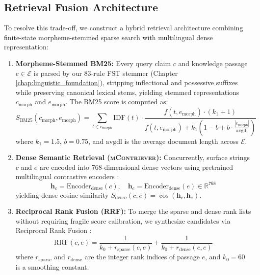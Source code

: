 \subsection{Retrieval Fusion Architecture}
To resolve this trade-off, we construct a hybrid retrieval architecture combining finite-state morpheme-stemmed sparse search with multilingual dense representation:
\begin{enumerate}
    \item \textbf{Morpheme-Stemmed BM25:} Every query claim $c$ and knowledge passage $e \in \mathcal{E}$ is parsed by our 83-rule FST stemmer (Chapter \ref{chap:linguistic_foundation}), stripping inflectional and possessive suffixes while preserving canonical lexical stems, yielding stemmed representations $c_{\text{morph}}$ and $e_{\text{morph}}$. The BM25 score is computed as:
    \begin{equation}
        \label{eq:bm25_stemmed}
        S_{\text{BM25}}(c_{\text{morph}}, e_{\text{morph}}) = \sum_{t \in c_{\text{morph}}} \mathrm{IDF}(t) \cdot \frac{f(t, e_{\text{morph}}) \cdot (k_1 + 1)}{f(t, e_{\text{morph}}) + k_1 \left(1 - b + b \cdot \frac{|e_{\text{morph}}|}{\mathrm{avgdl}}\right)}
    \end{equation}
    where $k_1 = 1.5$, $b = 0.75$, and $\mathrm{avgdl}$ is the average document length across $\mathcal{E}$.
    
    \item \textbf{Dense Semantic Retrieval (\textsc{mContriever}):} Concurrently, surface strings $c$ and $e$ are encoded into 768-dimensional dense vectors using pretrained multilingual contrastive encoders \citep{izacard2021contriever}:
    \begin{equation}
        \mathbf{h}_c = \mathrm{Encoder}_{\text{dense}}(c), \quad \mathbf{h}_e = \mathrm{Encoder}_{\text{dense}}(e) \in \mathbb{R}^{768}
    \end{equation}
    yielding dense cosine similarity $S_{\text{dense}}(c, e) = \cos(\mathbf{h}_c, \mathbf{h}_e)$.
    
    \item \textbf{Reciprocal Rank Fusion (RRF):} To merge the sparse and dense rank lists without requiring fragile score calibration, we synthesize candidates via Reciprocal Rank Fusion \citep{cormack2009reciprocal,karpukhin2020dpr}:
    \begin{equation}
        \label{eq:rrf_fusion}
        \mathrm{RRF}(c, e) = \frac{1}{k_0 + r_{\text{sparse}}(c, e)} + \frac{1}{k_0 + r_{\text{dense}}(c, e)}
    \end{equation}
    where $r_{\text{sparse}}$ and $r_{\text{dense}}$ are the integer rank indices of passage $e$, and $k_0 = 60$ is a smoothing constant.
\end{enumerate}

